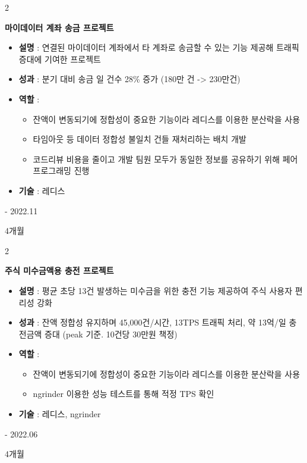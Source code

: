 \documentclass[10pt, letterpaper]{article}
\newenvironment{highlights}{
    \begin{itemize}[
        topsep=0.10 cm,
        parsep=0.10 cm,
        partopsep=0pt,
        itemsep=0pt,
        leftmargin=0.4 cm + 10pt
    ]
    }{
    \end{itemize}
} %
\newenvironment{twocolentry}[2][]{
    \onecolentry
    \def\secondColumn{#2}
    \setcolumnwidth{\fill, 4.5 cm}
    \begin{paracol}{2}
    }{
        \switchcolumn \raggedleft \secondColumn
    \end{paracol}
    \endonecolentry
} %
\begin{document}
    \vspace{0.2 cm}

    \begin{twocolentry}{
        2022.07 - 2022.11

        4개월
    }
        \textbf{마이데이터 계좌 송금 프로젝트}
        \begin{highlights}

            \item \textbf{설명} : 연결된 마이데이터 계좌에서 타 계좌로 송금할 수 있는 기능 제공해 트래픽 증대에 기여한 프로젝트
            \item \textbf{성과} : 분기 대비 송금 일 건수 28\% 증가 (180만 건 -> 230만건)
            \item \textbf{역할} :
            \begin{highlights}
                \item 잔액이 변동되기에 정합성이 중요한 기능이라 레디스를 이용한 분산락을 사용
                \item 타임아웃 등 데이터 정합성 불일치 건들 재처리하는 배치 개발
                \item 코드리뷰 비용을 줄이고 개발 팀원 모두가 동일한 정보를 공유하기 위해 페어프로그래밍 진행
            \end{highlights}
            \item \textbf{기술} : 레디스
        \end{highlights}
    \end{twocolentry}

    \vspace{0.2 cm}

    \begin{twocolentry}{
        2022.03 - 2022.06

        4개월
    }
        \textbf{주식 미수금액용 충전 프로젝트}
        \begin{highlights}

            \item \textbf{설명} : 평균 초당 13건 발생하는 미수금을 위한 충전 기능 제공하여 주식 사용자 편리성 강화
            \item \textbf{성과} : 잔액 정합성 유지하며 45,000건/시간, 13TPS 트래픽 처리, 약 13억/일 충전금액 증대 (peak 기준. 10건당 30만원 책정)
            \item \textbf{역할} :
            \begin{highlights}
                \item 잔액이 변동되기에 정합성이 중요한 기능이라 레디스를 이용한 분산락을 사용
                \item ngrinder 이용한 성능 테스트를 통해 적정 TPS 확인
            \end{highlights}
            \item \textbf{기술} : 레디스, ngrinder
        \end{highlights}
    \end{twocolentry}
\end{document}
